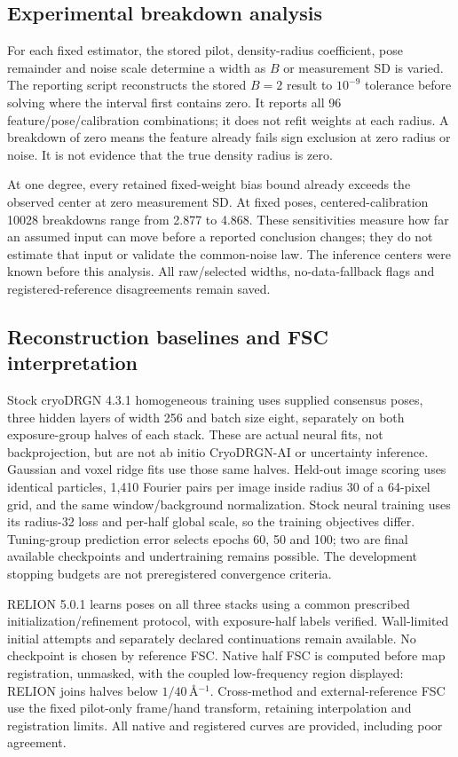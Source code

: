 \subsection{Experimental breakdown analysis}
For each fixed estimator, the stored pilot, density-radius coefficient,
pose remainder and noise scale determine a width as $B$ or measurement SD
is varied. The reporting script reconstructs the stored $B=2$ result to
$10^{-9}$ tolerance before solving where the interval first contains zero.
It reports all 96 feature/pose/calibration combinations; it does not refit
weights at each radius. A breakdown of zero means the feature already
fails sign exclusion at zero radius or noise. It is not evidence that the
true density radius is zero.

At one degree, every retained fixed-weight bias bound already exceeds the
observed center at zero measurement SD. At fixed poses, centered-calibration
10028 breakdowns range from 2.877 to 4.868. These sensitivities measure how
far an assumed input can move before a reported conclusion changes; they
do not estimate that input or validate the common-noise law. The inference
centers were known before this analysis. All raw/selected widths,
no-data-fallback flags and registered-reference disagreements remain saved.

\subsection{Reconstruction baselines and FSC interpretation}
Stock cryoDRGN 4.3.1 homogeneous training uses supplied consensus poses,
three hidden layers of width 256 and batch size eight, separately on both
exposure-group halves of each stack. These are actual neural fits, not
backprojection, but are not ab initio CryoDRGN-AI or uncertainty inference.
Gaussian and voxel ridge fits use those same halves. Held-out image scoring
uses identical particles, 1,410 Fourier pairs per image inside radius 30
of a 64-pixel grid, and the same window/background normalization. Stock
neural training uses its radius-32 loss and per-half global scale, so the
training objectives differ. Tuning-group prediction error selects epochs
60, 50 and 100; two are final available checkpoints and undertraining
remains possible. The development stopping budgets are not preregistered
convergence criteria.


RELION 5.0.1 learns poses on all three stacks using a common prescribed
initialization/refinement protocol, with exposure-half labels verified.
Wall-limited initial attempts and separately declared continuations remain
available. No checkpoint is chosen by reference FSC. Native half FSC is
computed before map registration, unmasked, with the coupled low-frequency
region displayed: RELION joins halves below $1/40$\,\AA$^{-1}$.
Cross-method and external-reference FSC use the fixed pilot-only frame/hand
transform, retaining interpolation and registration limits. All native and
registered curves are provided, including poor agreement.

